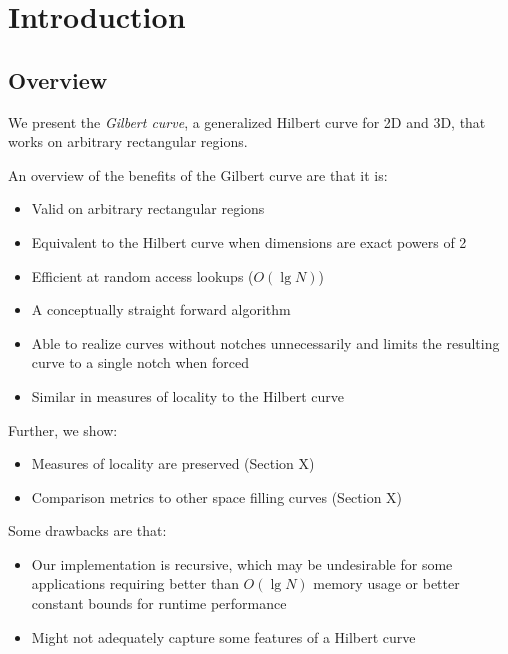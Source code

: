 \section{Introduction}

\subsection{Overview}

We present the \textit{Gilbert curve}, a generalized Hilbert curve for 2D and 3D,
that works on arbitrary rectangular regions.

An overview of the benefits of the Gilbert curve are that it is:

\begin{itemize}
  \item Valid on arbitrary rectangular regions
  \item Equivalent to the Hilbert curve when dimensions are exact powers of 2
  \item Efficient at random access lookups ($O(\lg N)$)
  \item A conceptually straight forward algorithm
  \item Able to realize curves without notches unnecessarily and limits the resulting curve
        to a single notch when forced
  \item Similar in measures of locality to the Hilbert curve
\end{itemize}

Further, we show:

\begin{itemize}
  \item Measures of locality are preserved (Section X)
  \item Comparison metrics to other space filling curves (Section X)
\end{itemize}

Some drawbacks are that:

\begin{itemize}
  \item Our implementation is recursive,
        which may be undesirable for some applications requiring better than $O( \lg N)$
        memory usage or better constant bounds for runtime performance
  \item Might not adequately capture some features of a Hilbert curve
\end{itemize}


